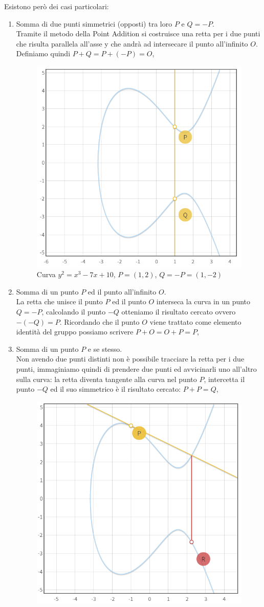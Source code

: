 \documentclass[a4paper,12pt]{tesiinfo}
\begin{document}
Esistono per\`o dei casi particolari:
\begin{enumerate}
  \item Somma di due punti simmetrici (opposti) tra loro $P$ e $Q = -P$. 
  \\
  Tramite il metodo della Point Addition si costruisce una retta per i due punti che risulta parallela all'asse y che andr\`a ad intersecare il punto all'infinito $O$. Definiamo quindi $P + Q = P+(-P) = O$,
  \begin{figure}[H]
    \includegraphics[width=.6\textwidth,center]{PA_P+(-P)}
    \caption{Curva $y^2 = x^3-7x+10$, $P=(1, 2)$, $Q=-P=(1, -2)$}
  \end{figure}
  \item Somma di un punto $P$ ed il punto all'infinito $O$. 
  \\ 
  La retta che unisce il punto $P$ ed il punto $O$ interseca la curva in un punto $Q = -P$, calcolando il punto $-Q$ otteniamo il risultato cercato ovvero $-(-Q) = P$.
  Ricordando che il punto $O$ viene trattato come elemento identit\`a del gruppo possiamo scrivere $P+O = O+P = P$,
  \item Somma di un punto $P$ e se stesso. 
  \\
  Non avendo due punti distinti non \`e possibile tracciare la retta per i due punti, immaginiamo quindi di prendere due punti ed avvicinarli uno all'altro sulla curva: la retta diventa tangente alla curva nel punto $P$, intercetta il punto $-Q$ ed il suo simmetrico \`e il risultato cercato: $P + P = Q$,
  \begin{figure}[H]
    \includegraphics[width=.6\textwidth,center]{PA_P+P}

\end{figure}
\end{enumerate}
\end{document}
